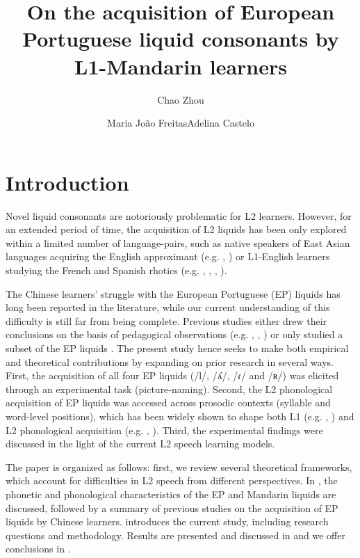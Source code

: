 \documentclass[output=paper]{../langscibook}
\author{Chao Zhou\affiliation{University of Lisbon}\and Maria João Freitas\affiliation{University of Lisbon}\lastand Adelina Castelo\affiliation{University of Lisbon}}
\title{On the acquisition of European Portuguese liquid consonants by L1-Mandarin learners}
\begin{document}
\maketitle
{}


\section{Introduction}

Novel liquid consonants are notoriously problematic for L2 learners. However, for an extended period of time, the acquisition of L2 liquids has been only explored within a limited number of language-pairs, such as native speakers of East Asian languages acquiring the English approximant (e.g. \citealt{AoyamaEtAl2004}, \citealt{Brown1998}) or L1-English learners studying the French and Spanish rhotics (e.g. \citealt{ColantoniSteele2007,ColantoniSteele2008}, \citealt{Face2006}, \citealt{Steele2009}, \citealt{Waltmunson2005}).

The Chinese learners’ struggle with the European Portuguese (EP) liquids has long been reported in the literature, while our current understanding of this difficulty is still far from being complete. Previous studies either drew their conclusions on the basis of pedagogical observations (e.g. \citealt{Batalha1995}, \citealt{EspadinhaSilva2009}, \citealt{Martins2008}) or only studied a subset of the EP liquids \citep{Oliveira2016}. The present study hence seeks to make both empirical and theoretical contributions by expanding on prior research in several ways. First, the acquisition of all four EP liquids (/l/, /ʎ/, /ɾ/ and /ʀ/) was elicited through an experimental task (picture-naming). Second, the L2 phonological acquisition of EP liquids was accessed across prosodic contexts (syllable and word-level positions), which has been widely shown to shape both L1 (e.g. \citealt{Fikkert1994}, \citealt{Freitas1997}) and L2 phonological acquisition (e.g. \citealt{Waltmunson2005}, \citealt{ColantoniSteele2008}). Third, the experimental findings were discussed in the light of the current L2 speech learning models.

The paper is organized as follows: first, we review several theoretical frameworks, which account for difficulties in L2 speech from different perspectives. In , the phonetic and phonological characteristics of the EP and Mandarin liquids are discussed, followed by a summary of previous studies on the acquisition of EP liquids by Chinese learners.  introduces the current study, including research questions and methodology. Results are presented and discussed in  and we offer conclusions in .
\end{document}
